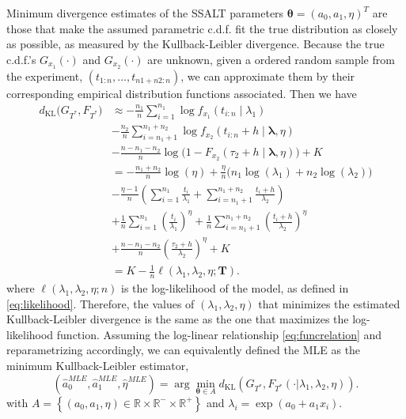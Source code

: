 \documentclass{article}
\begin{document}
Minimum divergence estimates of the SSALT parameters $ \boldsymbol{\theta} = (a_0, a_1, \eta)^T$ are those that make the assumed parametric  c.d.f. fit the true distribution as closely as possible, as measured by the Kullback-Leibler divergence. Because the true c.d.f.'s $G_{x_1}(\cdot)$ and $G_{x_2}(\cdot)$ are unknown, given a ordered random sample from the experiment, $(t_{1:n}, ..., t_{n1+n2:n})$, we can approximate them by their corresponding empirical distribution functions associated. Then we have
\begin{align}
d_{\mathrm{KL}}\bigl(G_{T^\ast}, F_{T^\ast}\bigr)
&\approx
- \frac{n_1}{n} \sum_{i=1}^{n_1} \log f_{x_1}(t_{i:n} \mid \lambda_1)
\nonumber\\
&
- \frac{n_2}{n} \sum_{i=n_1+1}^{n_1+n_2} \log f_{x_2}(t_{i:n}+h \mid \boldsymbol{\lambda},\eta)
\nonumber\\
&
- \frac{n-n_1-n_2}{n} \log\bigl(1 - F_{x_2}(\tau_2+h \mid \boldsymbol{\lambda},\eta)\bigr)
+ K \nonumber
\\
&= -\frac{n_1+n_2}{n} \log(\eta)
+ \frac{\eta}{n}\bigl(n_1 \log(\lambda_1) + n_2 \log(\lambda_2)\bigr)
\nonumber\\
&
- \frac{\eta-1}{n} \left(
\sum_{i=1}^{n_1} \frac{t_i}{\lambda_1}
+ \sum_{i=n_1+1}^{n_1+n_2} \frac{t_i+h}{\lambda_2}
\right)
\nonumber\\
&
+ \frac{1}{n} \sum_{i=1}^{n_1} \left(\frac{t_i}{\lambda_1}\right)^\eta
+ \frac{1}{n} \sum_{i=n_1+1}^{n_1+n_2} \left(\frac{t_i+h}{\lambda_2}\right)^\eta
\nonumber\\
&
+ \frac{n-n_1-n_2}{n} \left(\frac{\tau_2+h}{\lambda_2}\right)^\eta
+ K
\nonumber\\
&= K - \frac{1}{n} \ell(\lambda_1, \lambda_2, \eta; \bm{T}).
\end{align}
where $\ell(\lambda_1, \lambda_2,\eta ; n)$ is the log-likelihood of the model, as defined in \eqref{eq:likelihood}.
Therefore, the values of $(\lambda_1, \lambda_2,\eta)$ that minimizes the estimated Kullback-Leibler divergence is the same as the one that maximizes the log-likelihood function. Assuming the log-linear relationship \eqref{eq:funcrelation} and reparametrizing accordingly, we can equivalently defined the MLE as the minimum Kullback-Leibler estimator,
\begin{equation}
\left(\widehat{a}_0^{MLE}, \widehat{a}_1^{MLE},\widehat{\eta}^{MLE}\right)= \arg \min_{\bm{\theta} \in A}d_{\text{KL}} \left(G_{T^\ast}, F_{T^*}(\cdot|\lambda_1,\lambda_2,\eta)\right).
\label{eq:kl_min}
\end{equation}
with $A=\left\{ (a_0, a_1,\eta) \in \mathbb{R} \times  \mathbb{R}^{-} \times  \mathbb{R}^{+} \right\}$ and 
$\lambda_i=\exp\left(a_0+a_1x_i\right).$
\end{document}
